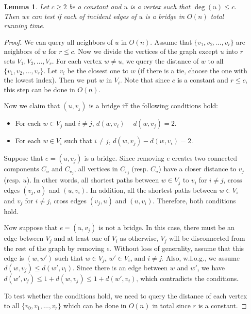 \documentclass[letterpaper,11pt]{article}
\newtheorem{lemma}[theorem]{Lemma}
\newenvironment{myproof}{
\vspace{-0.5cm}
\begin{proof}
}{
\end{proof}
}
\begin{document}
\begin{lemma}\label{lem:test-bridge}
Let $c \geq 2$ be a constant and $u$ is a vertex such that $\deg(u) \leq c$. Then we can test if each of incident edges of $u$ is a bridge in  $O(n)$ total running time.
\end{lemma}
\begin{myproof}
We can query all neighbors of $u$ in $O(n)$. Assume that $\{v_1, v_2, \ldots, v_r\}$ are neighbors of $u$ for $r \leq c$. Now we divide the vertices of the graph except $u$ into $r$ sets $V_1, V_2, \ldots, V_r$. For each vertex $w \neq u$, we query the distance of $w$ to all $\{v_1, v_2, \ldots, v_r\}$. Let $v_i$ be the closest one to $w$ (if there is a tie, choose the one with the lowest index). Then we put $w$ in $V_i$. Note that since $c$ is a constant and $r \leq c$, this step can be done in $O(n)$.


Now we claim that $(u, v_j)$ is a bridge iff the following conditions hold:
\begin{itemize}
    \item For each $w \in V_j$ and $i \neq j$, $d(w, v_i) - d(w, v_j) = 2.$
    \item For each $w \in V_i$ such that $i \neq j$, $d(w, v_j) - d(w, v_i) = 2.$
\end{itemize}

Suppose that $e = (u, v_j)$ is a bridge. Since removing $e$ creates two connected components $C_u$ and $C_{v_j}$, all vertices in $C_{v_j}$ (resp. $C_u$) have a closer distance to $v_j$ (resp. $u$). In other words, all shortest paths between $w \in V_j$ to $v_i$ for $i \neq j$, cross edges $(v_j,u)$ and $(u, v_i)$. In addition, all the shortest paths between $w \in V_i$ and $v_j$ for $i \neq j$, cross edges $(v_j,u)$ and $(u, v_i)$. Therefore, both conditions hold.

Now suppose that $e = (u, v_j)$ is not a bridge. In this case, there must be an edge between $V_j$ and at least one of $V_i$ as otherwise, $V_j$ will be disconnected from the rest of the graph by removing $e$. Without loss of generality, assume that this edge is $(w, w')$ such that $w \in V_j$, $w' \in V_i$, and $i \neq j$. Also, w.l.o.g., we assume $d(w,v_j) \leq d(w', v_i)$. Since there is an edge between $w$ and $w'$, we have $d(w', v_j) \leq 1 + d(w, v_j) \leq 1 + d(w', v_i)$, which contradicts the conditions.

To test whether the conditions hold, we need to query the distance of each vertex to all $\{v_0, v_1, \ldots, v_r\}$ which can be done in $O(n)$ in total since $r$ is a constant.
\end{myproof}
\end{document}
